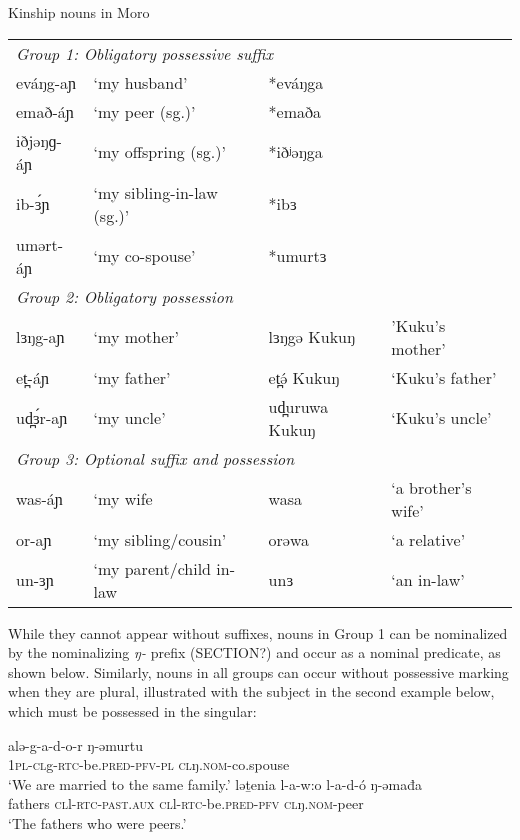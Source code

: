 \ea Kinship nouns in Moro
\begin{tabular}[t]{llll}
\multicolumn{4}{l}{\emph{Group 1: Obligatory possessive suffix}}\\
eváŋg-aɲ &	`my husband' & *eváŋga & \\
emað-áɲ	& `my peer (sg.)'	& *emaða & \\
iðjəŋɡ-áɲ	& `my offspring (sg.)'	& *iðʲəŋga & \\
ib-ɜ́ɲ	& `my sibling-in-law (sg.)'	& *ibɜ & \\
umərt-áɲ & `my co-spouse'	& *umurtɜ	\\
\multicolumn{4}{l}{\emph{Group 2: Obligatory possession}}\\
 lɜŋg-aɲ	& `my mother'	& lɜŋgə Kukuŋ & 'Kuku's mother' \\
et̪-áɲ	& `my father' &	 et̪ə́ Kukuŋ & `Kuku's father'\\
ud̪ɜ́r-aɲ &  `my uncle' & ud̪uruwa Kukuŋ & `Kuku's uncle' \\
\multicolumn{4}{l}{\emph{Group 3: Optional suffix and possession}} \\ 
was-áɲ & `my wife &  wasa & `a brother's wife' \\	
or-aɲ & `my sibling/cousin' & orəwa & `a relative' \\ 
un-ɜɲ & `my parent/child in-law & unɜ & `an in-law' \\
 \end{tabular} 
 \z 
 

While they cannot appear without suffixes, nouns in Group 1 can be nominalized by the nominalizing \textit{ŋ-} prefix (SECTION?) and occur as a nominal predicate, as shown below. Similarly, nouns in all groups can occur without possessive marking when they are plural, illustrated with the subject in the second example below, which must be possessed in the singular:

\ea 
	\ea \gll  alə-g-a-d-o-r ŋ-əmurtu\\
			1\textsc{pl}-\textsc{cl}g-\textsc{rtc}-be.\textsc{pred}-\textsc{pfv}-\textsc{pl} \textsc{cl}ŋ.\textsc{nom}-co.spouse\\
		\glt 	`We are married to the same family.' \label{kina}
	\ex \gll ləṯenia l-a-w:o l-a-d-ó ŋ-əmađa\\ 
	fathers \textsc{cl}l-\textsc{rtc}-{\textsc{past.aux}} \textsc{cl}l-\textsc{rtc}-{be.\textsc{pred}}-\textsc{pfv} \textsc{cl}ŋ.\textsc{nom}-peer\\
\glt 	`The fathers who were peers.' \label{kinb}
		\z
\z


